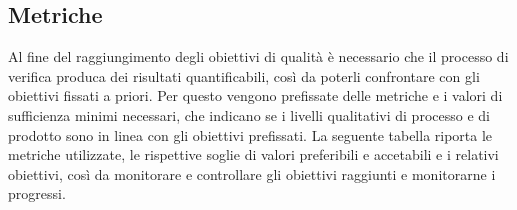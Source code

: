 \subsection{Metriche}
Al fine del raggiungimento degli obiettivi di qualità è necessario che il processo di verifica produca dei risultati quantificabili, così da poterli confrontare con gli obiettivi fissati a priori. Per questo vengono prefissate delle metriche e i valori di sufficienza minimi necessari, che indicano se i livelli qualitativi di processo e di prodotto sono in linea con gli obiettivi prefissati. La seguente tabella riporta le metriche utilizzate, le rispettive soglie di valori preferibili e accetabili e i relativi obiettivi, così da monitorare e controllare gli obiettivi raggiunti e monitorarne i progressi.

\renewcommand{\arraystretch}{1.5}

